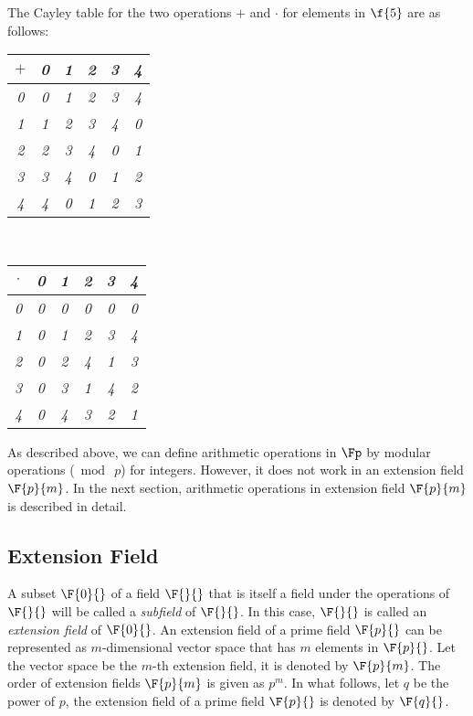 \begin{example}The Cayley table for the two operations $+$ and $\cdot$ for elements in $\f{5}$ are as follows:
	\begin{center}
		\begin{tabular}{c|ccccc}
			$+$&\em 0&\em 1&\em 2&\em 3&\em 4       \\
			\hline
			\em 0&\em 0&\em 1&\em 2&\em 3&\em 4       \\
			\em 1&\em 1&\em 2&\em 3&\em 4&\em 0      \\
			\em 2&\em 2&\em 3&\em 4&\em 0&\em 1      \\
			\em 3&\em 3&\em 4&\em 0&\em 1&\em 2      \\
			\em 4&\em 4&\em 0&\em 1&\em 2&\em 3      \\
		\end{tabular}\ \ 
		\begin{tabular}{c|ccccc}
			$\cdot$&\em 0&\em 1&\em 2&\em 3&\em 4       \\
			\hline
			\em 0&\em 0&\em 0&\em 0&\em 0&\em 0       \\
			\em 1&\em 0&\em 1&\em 2&\em 3&\em 4      \\
			\em 2&\em 0&\em 2&\em 4&\em 1&\em 3      \\
			\em 3&\em 0&\em 3&\em 1&\em 4&\em 2      \\
			\em 4&\em 0&\em 4&\em 3&\em 2&\em 1      \\
		\end{tabular}
	\end{center}
\end{example}
As described above, we can define arithmetic operations in $\Fp$ by modular operations ($\bmod\ p$) for integers. However, it does not work in an extension field $\F{p}{m}$. In the next section, arithmetic operations in extension field $\F{p}{m}$ is described in detail.


\subsection{Extension Field}
A subset $\F{0}{}$ of a field $\F{}{}$ that is itself a field under the operations of $\F{}{}$ will be called a {\it subfield} of $\F{}{}$.
In this case, $\F{}{}$ is called an {\it extension field} of $\F{0}{}$.
An extension field of a prime field $\F{p}{}$ can be represented as $m$-dimensional vector space that has $m$ elements in $\F{p}{}$.
Let the vector space be the $m$-th extension field, it is denoted by $\F{p}{m}$.
The order of extension fields $\F{p}{m}$ is given as $p^m$. 
In what follows, let $q$ be the power of $p$, the extension field of a prime field $\F{p}{}$ is denoted by $\F{q}{}$.



